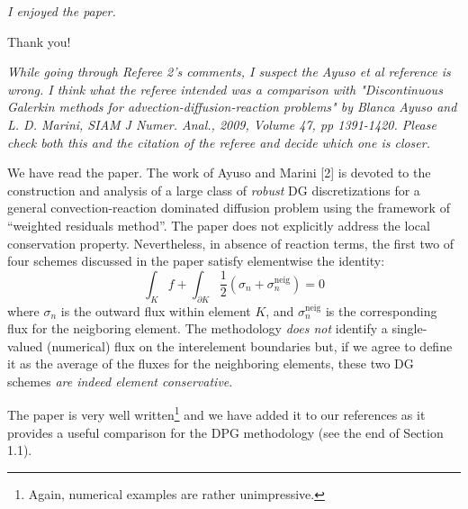 \documentclass[11pt,c]{article}
\newcommand{\ptl}{{\partial}}
\begin{document}
{\em I enjoyed the paper.}

Thank you!


     


{\em While going through Referee 2's comments, I suspect the Ayuso et al reference is wrong. I think what the referee intended was a comparison with  "Discontinuous Galerkin methods for advection-diffusion-reaction problems" by 
Blanca Ayuso and L. D. Marini, SIAM J Numer. Anal., 2009, Volume 47, pp 1391-1420. Please check both this and 
the citation of the referee and decide which one is closer.}


We have read the paper. The work of Ayuso and Marini [2] is devoted to the construction and analysis
of a large class of {\em robust} DG discretizations for a general convection-reaction dominated
diffusion problem using the framework of ``weighted residuals method''. The paper does not explicitly address the local conservation property.
Nevertheless, in absence of reaction terms, the first two of four schemes discussed in the paper 
satisfy elementwise the identity:
$$
\int_K f + \int_{\ptl K} \frac{1}{2} (\sigma_n + \sigma_n^{\text{neig}}) = 0
$$
where $\sigma_n$ is the outward flux within element $K$, and $\sigma_n^{\text{neig}}$ is the corresponding
flux
for the neigboring element. The methodology {\em does not} identify a single-valued (numerical) flux
on the interelement boundaries but, if we agree to define it as the average of the fluxes for the
neighboring elements, these two DG schemes {\em are indeed element conservative}.

The paper is very well written\footnote{Again, numerical examples are rather unimpressive.}
 and we have added it to our references
as it provides a useful comparison for the DPG methodology (see the end of Section 1.1).
\end{document}
